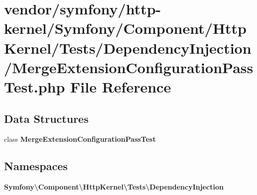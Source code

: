\section{vendor/symfony/http-\/kernel/\+Symfony/\+Component/\+Http\+Kernel/\+Tests/\+Dependency\+Injection/\+Merge\+Extension\+Configuration\+Pass\+Test.php File Reference}
\label{_merge_extension_configuration_pass_test_8php}
\subsection*{Data Structures}
\begin{DoxyCompactItemize}
\item 
class {\bf Merge\+Extension\+Configuration\+Pass\+Test}
\end{DoxyCompactItemize}
\subsection*{Namespaces}
\begin{DoxyCompactItemize}
\item 
 {\bf Symfony\textbackslash{}\+Component\textbackslash{}\+Http\+Kernel\textbackslash{}\+Tests\textbackslash{}\+Dependency\+Injection}
\end{DoxyCompactItemize}
